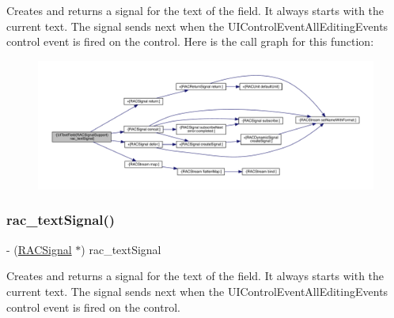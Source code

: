 Creates and returns a signal for the text of the field. It always starts with the current text. The signal sends next when the U\+I\+Control\+Event\+All\+Editing\+Events control event is fired on the control. Here is the call graph for this function\+:\nopagebreak
\begin{figure}[H]
\begin{center}
\leavevmode
\includegraphics[width=350pt]{category_u_i_text_field_07_r_a_c_signal_support_08_a08ba059db9a0942f9ff9efd80cde7edd_cgraph}
\end{center}
\end{figure}
\mbox{\label{category_u_i_text_field_07_r_a_c_signal_support_08_a08ba059db9a0942f9ff9efd80cde7edd}} 
\subsubsection{\texorpdfstring{rac\+\_\+text\+Signal()}{rac\_textSignal()}\hspace{0.1cm}{\footnotesize\ttfamily [2/3]}}
{\footnotesize\ttfamily -\/ (\mbox{\hyperlink{interface_r_a_c_signal}{R\+A\+C\+Signal}} $\ast$) rac\+\_\+text\+Signal \begin{DoxyParamCaption}{ }\end{DoxyParamCaption}}

Creates and returns a signal for the text of the field. It always starts with the current text. The signal sends next when the U\+I\+Control\+Event\+All\+Editing\+Events control event is fired on the control. \mbox{\label{category_u_i_text_field_07_r_a_c_signal_support_08_a08ba059db9a0942f9ff9efd80cde7edd}} 
